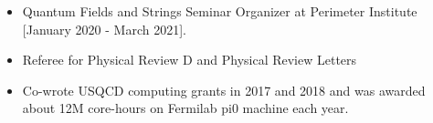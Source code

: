 \renewcommand{\arraystretch}{1.1}

	\begin{itemize}
	 \item Quantum Fields and Strings Seminar Organizer at Perimeter Institute [January 2020 - March 2021].
	  \item Referee for Physical Review D and Physical Review Letters %
	  \item Co-wrote USQCD computing grants in 2017 and 2018 and was awarded about 12M core-hours on Fermilab pi0 machine each year.
	  \end{itemize}
